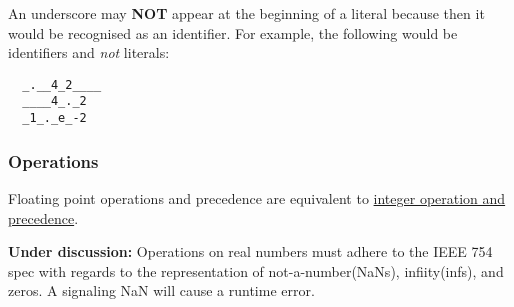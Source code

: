 \documentclass[types.tex]{subfiles}
\begin{document}
An underscore may \textbf{NOT} appear at the beginning of a  literal because then it
would be recognised as an identifier. For example, the following would be identifiers and
\textit{not}  literals:
\begin{lstlisting}
  _.__4_2____
  ____4_._2
  _1_._e_-2
\end{lstlisting}

\subsubsection{Operations}
Floating point operations and precedence are equivalent to \hyperref[sssec:integer_ops]{integer operation
and precedence}.

\textbf{Under discussion:} Operations on real numbers must adhere to the \textsf{IEEE 754} spec with regards to the representation of
not-a-number(NaNs), infiity(infs), and zeros. A signaling NaN will cause a runtime error.
\end{document}
